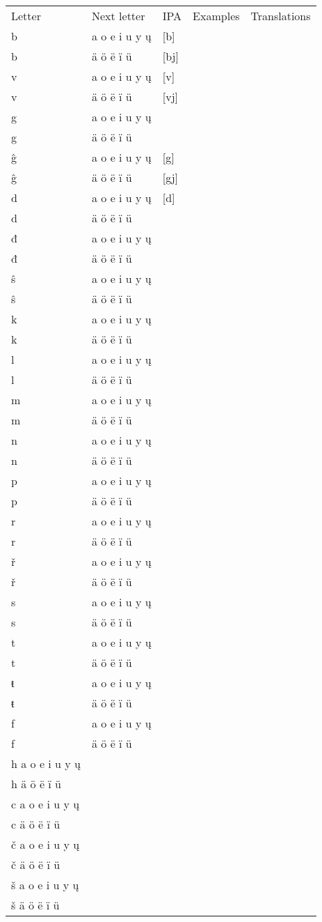 \begin{table}
	\begin{tabular}{lllll}
		Letter & Next letter & IPA & Examples & Translations \\
		b & a o e i u y ų  & [b] && \\
		b & ä ö ë ï ü & [bj] && \\
		v & a o e i u y ų & [v] && \\
		v & ä ö ë ï ü & [vj] && \\
		g & a o e i u y ų  & && \\
		g & ä ö ë ï ü &&& \\
		ĝ & a o e i u y ų  & [g] && \\
		ĝ & ä ö ë ï ü & [gj] && \\
		d & a o e i u y ų & [d] && \\
		d & ä ö ë ï ü &&& \\	
		đ & a o e i u y ų  &&& \\
		đ & ä ö ë ï ü &&& \\
		ŝ & a o e i u y ų  &&& \\
		ŝ & ä ö ë ï ü &&& \\
		k & a o e i u y ų &&& \\  
		k & ä ö ë ï ü  &&& \\ 
		l & a o e i u y ų  &&& \\  
		l & ä ö ë ï ü  &&& \\ 
		m & a o e i u y ų  &&& \\  
		m & ä ö ë ï ü  &&& \\
		n & a o e i u y ų  &&& \\  
		n & ä ö ë ï ü  &&& \\
		p & a o e i u y ų &&& \\  
		p & ä ö ë ï ü  &&& \\ 
		r & a o e i u y ų  &&& \\  
		r & ä ö ë ï ü  &&& \\
		ř & a o e i u y ų  &&& \\  
		ř & ä ö ë ï ü  &&& \\ 
		s & a o e i u y ų &&& \\  
		s & ä ö ë ï ü  &&& \\ 
		t & a o e i u y ų  &&& \\ 
		t & ä ö ë ï ü  &&& \\ 
		ŧ & a o e i u y ų  &&& \\  
		ŧ & ä ö ë ï ü  &&& \\ 
		f & a o e i u y ų  &&& \\  
		f & ä ö ë ï ü  &&& \\
		h a o e i u y ų   &&& \\
		h ä ö ë ï ü  &&& \\
		c a o e i u y ų   &&& \\
		c ä ö ë ï ü  &&& \\
		č a o e i u y ų   &&& \\
		č ä ö ë ï ü  &&& \\
		š a o e i u y ų   &&& \\
		š ä ö ë ï ü  &&& \\		
	\end{tabular}
\end{table}

